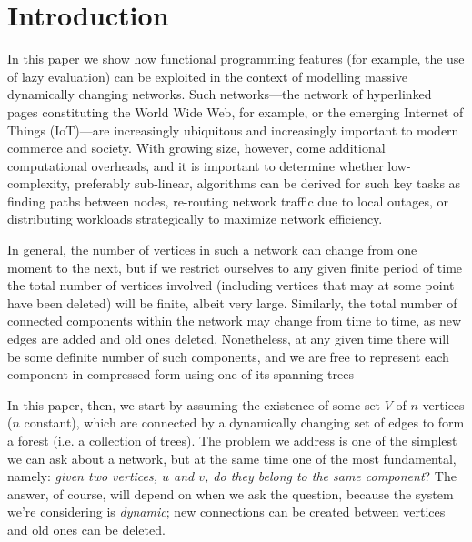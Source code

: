 \section{Introduction}
\label{sec:Intro}

In this paper we show how functional programming features (for example, the use of lazy evaluation) can be exploited in the context of modelling massive dynamically changing networks. Such networks---the network of hyperlinked pages constituting the World Wide Web, for example, or the emerging Internet of Things (IoT)---are increasingly ubiquitous and increasingly important to modern commerce and society. With growing size, however, come additional computational overheads, and it is important to determine whether low-complexity, preferably sub-linear, algorithms can be derived for such key tasks as finding paths between nodes, re-routing network traffic due to local outages, or distributing workloads strategically to maximize network efficiency.



In general, the number of vertices in such a network can change from one moment to the next, but if we restrict ourselves to any given finite period of time the total number of vertices involved (including vertices that may at some point have been deleted) will be finite, albeit very large. Similarly, the total number of connected components within the network may change from time to time, as new edges are added and old ones deleted. Nonetheless, at any given time there will be some definite number of such components, and we are free to represent each component in compressed form using one of its spanning trees 

In this paper, then, we start by assuming the existence of some set $V$ of $n$ vertices ($n$ constant), which are connected by a dynamically changing set of edges to form a forest (i.e. a collection of trees). The problem we address is one of the simplest we can ask about a network, but at the same time one of the most fundamental, namely: \emph{given two vertices, $u$ and $v$, do they belong to the same component}? The answer, of course, will depend on when we ask the question, because the system we're considering is \emph{dynamic}; new connections can be created between vertices and old ones can be deleted. 

